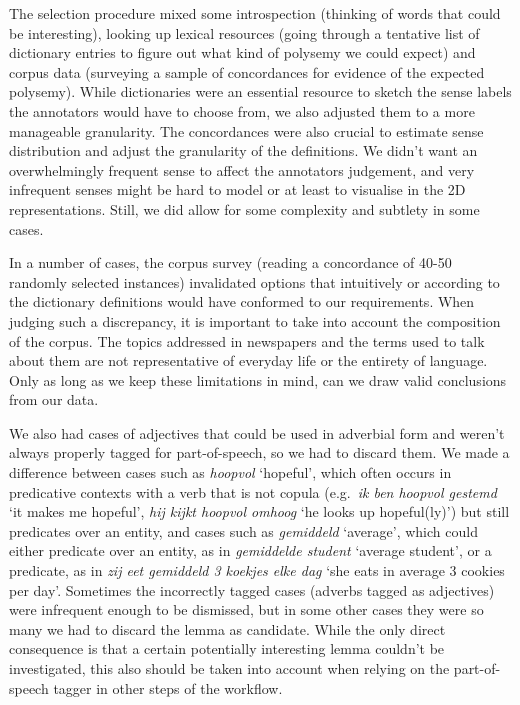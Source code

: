 \documentclass[
]{book}
\begin{document}
The selection procedure mixed some introspection (thinking of words that could be interesting), looking up lexical resources (going through a tentative list of dictionary entries to figure out what kind of polysemy we could expect) and corpus data (surveying a sample of concordances for evidence of the expected polysemy). While dictionaries were an essential resource to sketch the sense labels the annotators would have to choose from, we also adjusted them to a more manageable granularity. The concordances were also crucial to estimate sense distribution and adjust the granularity of the definitions. We didn't want an overwhelmingly frequent sense to affect the annotators judgement, and very infrequent senses might be hard to model or at least to visualise in the 2D representations. Still, we did allow for some complexity and subtlety in some cases.

In a number of cases, the corpus survey (reading a concordance of 40-50 randomly selected instances) invalidated options that intuitively or according to the dictionary definitions would have conformed to our requirements. When judging such a discrepancy, it is important to take into account the composition of the corpus. The topics addressed in newspapers and the terms used to talk about them are not representative of everyday life or the entirety of language. Only as long as we keep these limitations in mind, can we draw valid conclusions from our data.

We also had cases of adjectives that could be used in adverbial form and weren't always properly tagged for part-of-speech, so we had to discard them. We made a difference between cases such as \emph{hoopvol} `hopeful', which often occurs in predicative contexts with a verb that is not copula (e.g.~\emph{ik ben hoopvol gestemd} `it makes me hopeful', \emph{hij kijkt hoopvol omhoog} `he looks up hopeful(ly)') but still predicates over an entity, and cases such as \emph{gemiddeld} `average', which could either predicate over an entity, as in \emph{gemiddelde student} `average student', or a predicate, as in \emph{zij eet gemiddeld 3 koekjes elke dag} `she eats in average 3 cookies per day'. Sometimes the incorrectly tagged cases (adverbs tagged as adjectives) were infrequent enough to be dismissed, but in some other cases they were so many we had to discard the lemma as candidate. While the only direct consequence is that a certain potentially interesting lemma couldn't be investigated, this also should be taken into account when relying on the part-of-speech tagger in other steps of the workflow.
\end{document}
